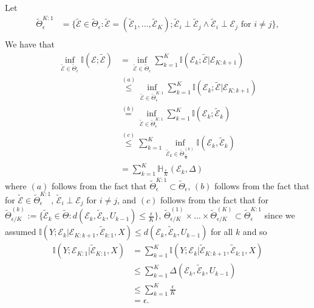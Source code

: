 \documentclass[twoside,11pt]{article}
\renewenvironment{proof}{\par\noindent{\bf Proof\ }}{\hfill\BlackBox\\[2mm]}
\newenvironment{proof}{\par\noindent{\bf Proof\ }}{\hfill\BlackBox\\[2mm]}
\def\environment{\mathcal{E}}
\def\proxy{\tilde{\environment}}
\def\proxyset{\tilde{\Theta}}
\def\H{\mathbb{H}}
\def\I{\mathbb{I}}
\begin{document}
\begin{proof}
    Let
    \begin{align*}
        \proxyset^{K:1}_\epsilon
        & = \{\proxy\in\proxyset_\epsilon: \proxy = (\proxy_1, \hdots, \proxy_K); \proxy_i \perp \proxy_j \land \proxy_i \perp \environment_j \text{ for } i\ne j\},\\
    \end{align*}
    We have that
    \begin{align*}
        \inf_{\proxy\in\proxyset_\epsilon} \I(\environment;\proxy)
        & = \inf_{\proxy\in\proxyset_\epsilon} \sum_{k=1}^{K}\I(\environment_k;\proxy|\environment_{K:k+1})\\
        & \overset{(a)}{\leq} \inf_{\proxy\in\proxyset^{K:1}_\epsilon} \sum_{k=1}^{K}\I(\environment_k;\proxy|\environment_{K:k+1})\\
        & \overset{(b)}{=} \inf_{\proxy\in\proxyset^{K:1}_\epsilon} \sum_{k=1}^{K}\I(\environment_k;\proxy_k)\\
        & \overset{(c)}{\leq} \sum_{k=1}^{K} \inf_{\proxy_k \in \proxyset^{(k)}_{ \frac{\epsilon}{K}}}\I(\environment_k, \proxy_k)\\
        & = \sum_{k=1}^{K}\H_{\frac{\epsilon}{K}}(\environment_k, \Delta)
    \end{align*}
    where $(a)$ follows from the fact that $\proxyset^{K:1}_\epsilon\subset\proxyset_\epsilon$, $(b)$ follows from the fact that for $\proxy\in\proxyset_{\epsilon}^{K:1}$, $\proxy_i \perp \environment_j$ for $i \neq j$, and $(c)$ follows from the fact that for $\proxyset^{(k)}_{\epsilon/K} := \{\proxy_k \in \proxyset: d(\environment_k, \proxy_k, U_{k-1}) \leq \frac{\epsilon}{K}\}$,
    $\proxyset^{(1)}_{\epsilon/K}\times\hdots\times \proxyset^{(K)}_{\epsilon/K} \subset \proxyset^{K:1}_\epsilon$ since we assumed $\I(Y;\environment_{k}|\environment_{K:k+1}, \proxy_{k:1}, X) \leq d(\environment_k, \proxy_k, U_{k-1})$ for all $k$ and so
    \begin{align*}
        \I(Y;\environment_{K:1}|\proxy_{K:1}, X)
        & = \sum_{k=1}^{K}\I(Y;\environment_k|\proxy_{K:k+1}, \proxy_{k:1}, X)\\
        & \leq \sum_{k=1}^{K}\Delta(\environment_k, \proxy_k, U_{k-1})\\
        & \leq \sum_{k=1}^{K}\frac{\epsilon}{K}\\
        & = \epsilon.
    \end{align*}
   
\end{proof}
\end{document}

